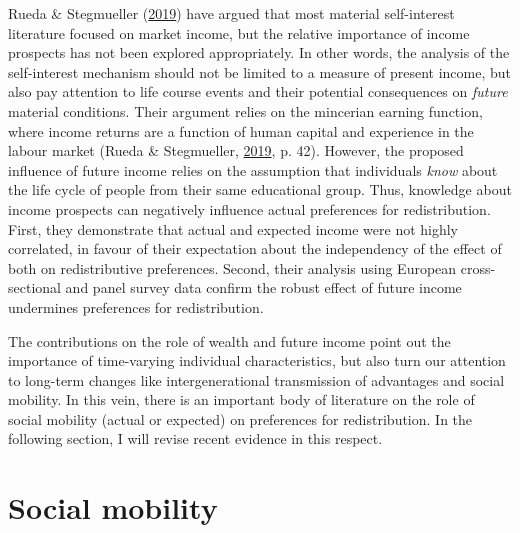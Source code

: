 \documentclass[
  12pt,
]{book}
\begin{document}
Rueda \& Stegmueller (\protect\hyperlink{ref-rueda_who_2019}{2019}) have argued that most material self-interest literature focused on market income, but the relative importance of income prospects has not been explored appropriately. In other words, the analysis of the self-interest mechanism should not be limited to a measure of present income, but also pay attention to life course events and their potential consequences on \emph{future} material conditions. Their argument relies on the mincerian earning function, where income returns are a function of human capital and experience in the labour market (Rueda \& Stegmueller, \protect\hyperlink{ref-rueda_who_2019}{2019}, p. 42). However, the proposed influence of future income relies on the assumption that individuals \emph{know} about the life cycle of people from their same educational group. Thus, knowledge about income prospects can negatively influence actual preferences for redistribution. First, they demonstrate that actual and expected income were not highly correlated, in favour of their expectation about the independency of the effect of both on redistributive preferences. Second, their analysis using European cross-sectional and panel survey data confirm the robust effect of future income undermines preferences for redistribution.

The contributions on the role of wealth and future income point out the importance of time-varying individual characteristics, but also turn our attention to long-term changes like intergenerational transmission of advantages and social mobility. In this vein, there is an important body of literature on the role of social mobility (actual or expected) on preferences for redistribution. In the following section, I will revise recent evidence in this respect.

\hypertarget{social-mobility}{%
\section{Social mobility}\label{social-mobility}}
\end{document}
